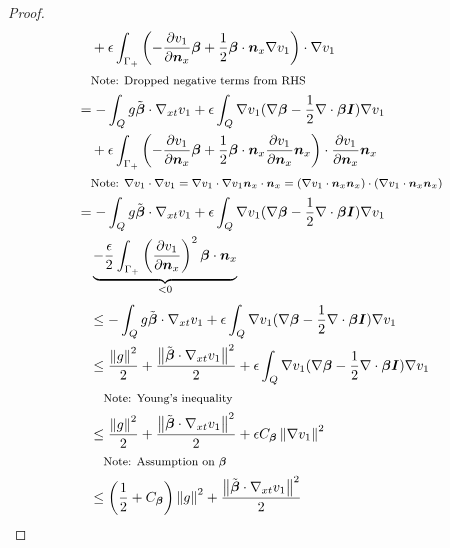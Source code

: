 \documentclass[Dissertation.tex]{subfiles}
\begin{document}
\begin{proof}
\begin{align*}
&\quad
+\epsilon\int_{\Gamma_+}\LRp{-\pd{v_1}{\bfn_x}\bfbeta
+\frac{1}{2}\bfbeta\cdot\bfn_x\Grad v_1}\cdot\Grad v_1\\
&\quad\footnotesize{\text{Note: Dropped negative terms from RHS}}
\\
%
&=-\int_Q g\tilde\bfbeta\cdot\Gradxt v_1
+\epsilon\int_Q\Grad v_1(\Grad\bfbeta-\frac{1}{2}\Div\bfbeta\bfI)\Grad v_1\\
&\quad
+\epsilon\int_{\Gamma_+}\LRp{-\pd{v_1}{\bfn_x}\bfbeta
+\frac{1}{2}\bfbeta\cdot\bfn_x\pd{v_1}{\bfn_x}\bfn_x}\cdot\pd{v_1}{\bfn_x}\bfn_x\\
&\quad\footnotesize{\text{Note: }\Grad v_1\cdot\Grad v_1=\Grad v_1\cdot\Grad v_1\bfn_x\cdot\bfn_x=
(\Grad v_1\cdot\bfn_x\bfn_x)\cdot(\Grad v_1\cdot\bfn_x\bfn_x)}
\\
%
&=-\int_Q g\tilde\bfbeta\cdot\Gradxt v_1
+\epsilon\int_Q\Grad v_1(\Grad\bfbeta-\frac{1}{2}\Div\bfbeta\bfI)\Grad v_1\\
&\quad
\underbrace{-\frac{\epsilon}{2}\int_{\Gamma_+}\LRp{\pd{v_1}{\bfn_x}}^2\bfbeta\cdot\bfn_x}_{<0}\\
\end{align*}
\begin{align*}
%
&\leq-\int_Q g\tilde\bfbeta\cdot\Gradxt v_1
+\epsilon\int_Q\Grad v_1(\Grad\bfbeta-\frac{1}{2}\Div\bfbeta\bfI)\Grad v_1\\
%
&\leq\frac{\norm{g}^2}{2}+\frac{\norm{\tilde\bfbeta\cdot\Gradxt v_1}^2}{2}
+\epsilon\int_Q\Grad v_1(\Grad\bfbeta-\frac{1}{2}\Div\bfbeta\bfI)\Grad v_1\\
&\quad\footnotesize{\text{Note: Young's inequality}}
\\
%
&\leq\frac{\norm{g}^2}{2}+\frac{\norm{\tilde\bfbeta\cdot\Gradxt v_1}^2}{2}
+\epsilon C_{\bfbeta}\norm{\Grad v_1}^2\\
&\quad\footnotesize{\text{Note: Assumption on }\bfbeta}
\\
%
&\leq\LRp{\frac{1}{2}+C_{\bfbeta}}\norm{g}^2+\frac{\norm{\tilde\bfbeta\cdot\Gradxt v_1}^2}{2}
\end{align*}
\end{proof}
\end{document}
